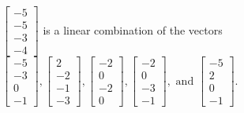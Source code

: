 \begin{exercise}
\begin{exerciseStatement}
  \end{exerciseStatement}
  \begin{exerciseAnswer}
   \(\left[\begin{array}{c}
-5 \\
-5 \\
-3 \\
-4
\end{array}\right]\) 
  	 is  
	a linear combination of the vectors \(\left[\begin{array}{c}
-5 \\
-3 \\
0 \\
-1
\end{array}\right] , \left[\begin{array}{c}
2 \\
-2 \\
-1 \\
-3
\end{array}\right] , \left[\begin{array}{c}
-2 \\
0 \\
-2 \\
0
\end{array}\right] , \left[\begin{array}{c}
-2 \\
0 \\
-3 \\
-1
\end{array}\right] , \text{ and } \left[\begin{array}{c}
-5 \\
2 \\
0 \\
-1
\end{array}\right]\).

	
  


  \end{exerciseAnswer}
\end{exercise}